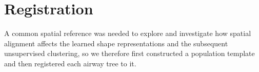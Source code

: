 
\section{Registration}           %
\label{sec:registration}         %

A common spatial reference was needed to explore and investigate how spatial alignment affects the learned shape representations and the subsequent unsupervised clustering, so we therefore first constructed a population template and then registered each airway tree to it. 

